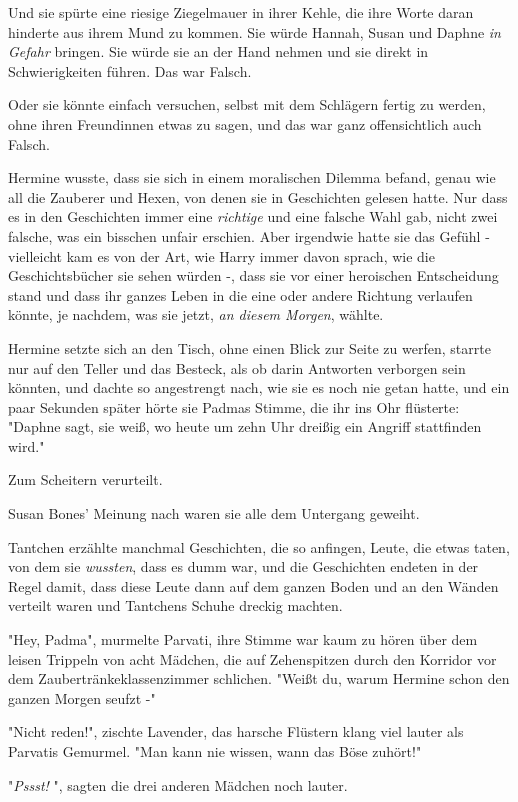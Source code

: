 {Und sie spürte eine riesige Ziegelmauer in ihrer Kehle, die ihre Worte daran hinderte aus ihrem Mund zu kommen. Sie würde Hannah, Susan und Daphne \emph{in Gefahr} bringen. Sie würde sie an der Hand nehmen und sie direkt in Schwierigkeiten führen. Das war Falsch.

Oder sie könnte einfach versuchen, selbst mit dem Schlägern fertig zu werden, ohne ihren Freundinnen etwas zu sagen, und das war ganz offensichtlich auch Falsch.

Hermine wusste, dass sie sich in einem moralischen Dilemma befand, genau wie all die Zauberer und Hexen, von denen sie in Geschichten gelesen hatte. Nur dass es in den Geschichten immer eine \emph{richtige} und eine falsche Wahl gab, nicht zwei falsche, was ein bisschen unfair erschien. Aber irgendwie hatte sie das Gefühl - vielleicht kam es von der Art, wie Harry immer davon sprach, wie die Geschichtsbücher sie sehen würden -, dass sie vor einer heroischen Entscheidung stand und dass ihr ganzes Leben in die eine oder andere Richtung verlaufen könnte, je nachdem, was sie jetzt, \emph{an diesem Morgen}, wählte.

Hermine setzte sich an den Tisch, ohne einen Blick zur Seite zu werfen, starrte nur auf den Teller und das Besteck, als ob darin Antworten verborgen sein könnten, und dachte so angestrengt nach, wie sie es noch nie getan hatte, und ein paar Sekunden später hörte sie Padmas Stimme, die ihr ins Ohr flüsterte: "Daphne sagt, sie weiß, wo heute um zehn Uhr dreißig ein Angriff stattfinden wird."

Zum Scheitern verurteilt.

Susan Bones' Meinung nach waren sie alle dem Untergang geweiht.

Tantchen erzählte manchmal Geschichten, die so anfingen, Leute, die etwas taten, von dem sie \emph{wussten}, dass es dumm war, und die Geschichten endeten in der Regel damit, dass diese Leute dann auf dem ganzen Boden und an den Wänden verteilt waren und Tantchens Schuhe dreckig machten.

"Hey, Padma", murmelte Parvati, ihre Stimme war kaum zu hören über dem leisen Trippeln von acht Mädchen, die auf Zehenspitzen durch den Korridor vor dem Zaubertränkeklassenzimmer schlichen. "Weißt du, warum Hermine schon den ganzen Morgen seufzt -"

"Nicht reden!", zischte Lavender, das harsche Flüstern klang viel lauter als Parvatis Gemurmel. "Man kann nie wissen, wann das Böse zuhört!"

"\emph{Pssst!} ", sagten die drei anderen Mädchen noch lauter.

}
